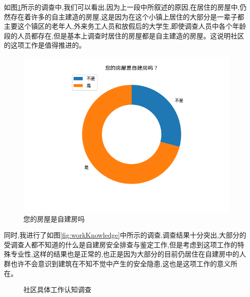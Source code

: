 \documentclass[AutoFakeBold]{LZUThesis}
\begin{document}
如图\ref{fig:selfBuilt}所示的调查中,我们可以看出,因为上一段中所叙述的原因,在居住的房屋中,仍然存在着许多的自主建造的房屋,这是因为在这个小镇上居住的大部分是一辈子都主要这个镇区的老年人,外来务工人员和放假后的大学生,即使调查人员中各个年龄段的人员都存在,但是基本上调查时居住的房屋都是自主建造的房屋。这说明社区的这项工作是值得推进的。

\begin{figure}[!h]
	\centering
	\includegraphics[width=4 in]{figures/selfBuilt.png}
	\caption{您的房屋是自建房吗}
	\label{fig:selfBuilt}
\end{figure}

\newpage

同时,我进行了如图\ref{fig:workKnowledge}中所示的调查,调查结果十分突出,大部分的受调查人都不知道的什么是自建房安全排查与鉴定工作,但是考虑到这项工作的特殊专业性,这样的结果也是正常的,也正是因为大部分的目前仍居住在自建房中的人群也许不会意识到建筑在不知不觉中产生的安全隐患,这也是这项工作的意义所在。

\begin{figure}[!h]
	\centering
	\hspace{0 pt}
	\caption{社区具体工作认知调查}

\end{figure}
\end{document}
